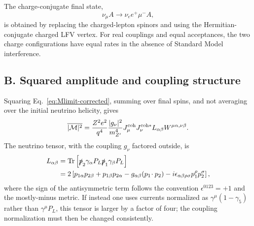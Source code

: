 \documentclass[
  aps,
  prl,
  twocolumn,
  superscriptaddress,
  amsmath, amssymb,
  floatfix, nofootinbib,
  longbibliography,
]{revtex4-2}
\newcommand{\numu}{\nu_\mu}
\newcommand{\nue}{\nu_e}
\newcommand{\Zp}{Z^{\prime}}
\newcommand{\mZp}{m_{\Zp}}
\newcommand{\gnu}{{g_\nu}}
\newcommand{\PL}{P_L}
\newcommand{\Tr}{\mathrm{Tr}}
\begin{document}
The charge-conjugate final state,
\begin{equation}
  \numu A\to\nue e^+\mu^- A,
\end{equation}
is obtained by replacing the charged-lepton spinors and using the
Hermitian-conjugate charged LFV vertex.  For real couplings and equal
acceptances, the two charge configurations have equal rates in the
absence of Standard Model interference.

\subsection*{B. Squared amplitude and coupling structure}

Squaring Eq.~\eqref{eq:Mlimit-corrected}, summing over final spins,
and not averaging over the initial neutrino helicity, gives
\begin{equation}
  \overline{|\mathcal M|^2}
  =
  \frac{Z^2e^2}{q^4}
  \frac{|\gnu|^2}{\mZp^4}
  J^{\rm coh}_\mu J^{\rm coh*}_\nu
  L_{\alpha\beta}
  W^{\mu\alpha,\nu\beta}.
\label{eq:M2-corrected}
\end{equation}
The neutrino tensor, with the coupling $\gnu$ factored outside, is
\begin{align}
  L_{\alpha\beta}
  &=
  \Tr\left[
  \slashed p_2\gamma_\alpha\PL
  \slashed p_1\gamma_\beta\PL
  \right]
  \nonumber\\
  &=
  2\left[
  p_{1\alpha}p_{2\beta}+p_{1\beta}p_{2\alpha}
  -g_{\alpha\beta}(p_1\!\cdot p_2)
  -i\epsilon_{\alpha\beta\rho\sigma}p_1^\rho p_2^\sigma
  \right],
\label{eq:Lmunu-corrected}
\end{align}
where the sign of the antisymmetric term follows the convention
$\epsilon^{0123}=+1$ and the mostly-minus metric.  If instead one
uses currents normalized as $\gamma^\mu(1-\gamma_5)$ rather than
$\gamma^\mu P_L$, this tensor is larger by a factor of four; the
coupling normalization must then be changed consistently.
\end{document}
